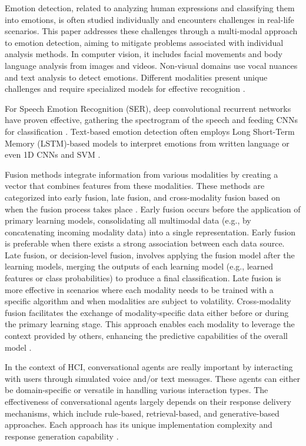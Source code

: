 \documentclass[runningheads]{llncs}
\begin{document}
Emotion detection, related to analyzing human expressions and classifying them into emotions, is often studied individually and encounters challenges in real-life scenarios. This paper addresses these challenges through a multi-modal approach to emotion detection, aiming to mitigate problems associated with individual analysis methods. In computer vision, it includes facial movements and body language analysis from images and videos. Non-visual domains use vocal nuances and text analysis to detect emotions. Different modalities present unique challenges and require specialized models for effective recognition \cite{Chul2018, Trigeorgis2016, Karna2020}.

For Speech Emotion Recognition (SER), deep convolutional recurrent networks have proven effective, gathering the spectrogram of the speech and feeding CNNs for classification \cite{Badshah2017}. Text-based emotion detection often employs Long Short-Term Memory (LSTM)-based models to interpret emotions from written language \cite{Trigeorgis2016, Karna2020} or even 1D CNNs and SVM \cite{hung_beyond_2023}.

Fusion methods integrate information from various modalities by creating a vector that combines features from these modalities. These methods are categorized into early fusion, late fusion, and cross-modality fusion based on when the fusion process takes place \cite{sleeman_multimodal_2022, zhu_multimodal_2023}. Early fusion occurs before the application of primary learning models, consolidating all multimodal data (e.g., by concatenating incoming modality data) into a single representation. Early fusion is preferable when there exists a strong association between each data source. Late fusion, or decision-level fusion, involves applying the fusion model after the learning models, merging the outputs of each learning model (e.g., learned features or class probabilities) to produce a final classification. Late fusion is more effective in scenarios where each modality needs to be trained with a specific algorithm and when modalities are subject to volatility. Cross-modality fusion facilitates the exchange of modality-specific data either before or during the primary learning stage. This approach enables each modality to leverage the context provided by others, enhancing the predictive capabilities of the overall model \cite{sleeman_multimodal_2022}.

In the context of HCI, conversational agents are really important by interacting with users through simulated voice and/or text messages. These agents can either be domain-specific or versatile in handling various interaction types. The effectiveness of conversational agents largely depends on their response delivery mechanisms, which include rule-based, retrieval-based, and generative-based approaches. Each approach has its unique implementation complexity and response generation capability \cite{fernandes_survey_2020, ramesh_survey_2017}.
\end{document}
